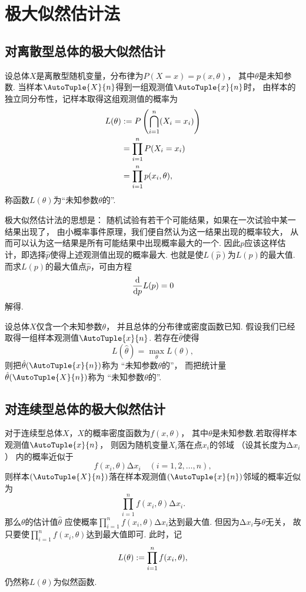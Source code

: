 \section{极大似然估计法}
\subsection{对离散型总体的极大似然估计}
设总体\(X\)是离散型随机变量，分布律为\(P(X=x)=p(x,\theta)\)，
其中\(\theta\)是未知参数.
当样本\(\AutoTuple{X}{n}\)得到一组观测值\(\AutoTuple{x}{n}\)时，
由样本的独立同分布性，记样本取得这组观测值的概率为
\begin{align*}
	L(\theta)
	&:= P\left(\bigcap_{i=1}^n(X_i=x_i)\right) \\
	&= \prod_{i=1}^n P(X_i=x_i) \\
	&= \prod_{i=1}^n p(x_i,\theta),
\end{align*}
称函数\(L(\theta)\)为“未知参数\(\theta\)的”.

极大似然估计法的思想是：
随机试验有若干个可能结果，如果在一次试验中某一结果出现了，
由小概率事件原理，我们便自然认为这一结果出现的概率较大，
从而可以认为这一结果是所有可能结果中出现概率最大的一个.
因此\(p\)应该这样估计，即选择\(\hat{p}\)使得上述观测值出现的概率最大.
也就是使\(L(\hat{p})\)为\(L(p)\)的最大值.
而求\(L(p)\)的最大值点\(\hat{p}\)，可由方程\[
	\dv{p} L(p) = 0
\]解得.

\begin{definition}
设总体\(X\)仅含一个未知参数\(\theta\)，
并且总体的分布律或密度函数已知.
假设我们已经取得一组样本观测值\(\AutoTuple{x}{n}\).
若存在\(\hat{\theta}\)使得\[
	L(\hat{\theta}) = \max_\theta L(\theta),
\]
则把\(\hat{\theta}(\AutoTuple{x}{n})\)称为
“未知参数\(\theta\)的”，
而把统计量\(\hat{\theta}(\AutoTuple{X}{n})\)称为
“未知参数\(\theta\)的”.
\end{definition}

\subsection{对连续型总体的极大似然估计}
对于连续型总体\(X\)，\(X\)的概率密度函数为\(f(x,\theta)\)，
其中\(\theta\)是未知参数.若取得样本观测值\(\AutoTuple{x}{n}\)，
则因为随机变量\(X_i\)落在点\(x_i\)的邻域
（设其长度为\(\increment x_i\)）
内的概率近似于\[
	f(x_i,\theta) \increment x_i
	\quad(i=1,2,\dotsc,n),
\]
则样本\((\AutoTuple{X}{n})\)落在样本观测值\((\AutoTuple{x}{n})\)邻域的概率近似为\[
	\prod_{i=1}^n f(x_i,\theta) \increment x_i.
\]
那么\(\theta\)的估计值\(\hat{\theta}\)
应使概率\(\prod_{i=1}^n f(x_i,\theta) \increment x_i\)达到最大值.
但因为\(\increment x_i\)与\(\theta\)无关，
故只要使\(\prod_{i=1}^n{f(x_i,\theta)}\)达到最大值即可.
此时，记\[
	L(\theta) := \prod_{i=1}^n{f(x_i,\theta)},
\]
仍然称\(L(\theta)\)为似然函数.


